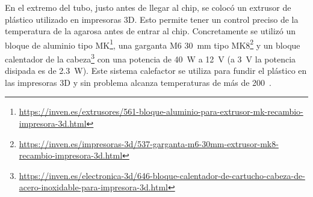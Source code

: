 En el extremo del tubo, justo antes de llegar al chip, se colocó un extrusor de plástico utilizado en impresoras 3D. Esto permite tener un control preciso de la temperatura de la agarosa antes de entrar al chip. Concretamente se utilizó un bloque de aluminio tipo MK\footnote{\url{https://inven.es/extrusores/561-bloque-aluminio-para-extrusor-mk-recambio-impresora-3d.html}}, una garganta M6 30~mm tipo MK8\footnote{\url{https://inven.es/impresoras-3d/537-garganta-m6-30mm-extrusor-mk8-recambio-impresora-3d.html}} y un bloque calentador de la cabeza\footnote{\url{https://inven.es/electronica-3d/646-bloque-calentador-de-cartucho-cabeza-de-acero-inoxidable-para-impresora-3d.html}} con una potencia de 40~W a 12~V (a 3~V la potencia disipada es de 2.3~W). Este sistema calefactor se utiliza para fundir el plástico en las impresoras 3D y sin problema alcanza temperaturas de más de 200~\celsius.



